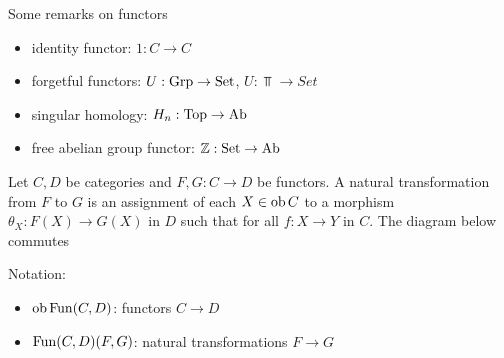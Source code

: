 \documentclass{report}
\begin{document}
\begin{remark}
    Some remarks on functors
    \begin{itemize}
        \item identity functor: $1: C \to C$
        \item forgetful functors: $U: \operatorname{Grp} \to \operatorname{Set}$, $U: \Top \to Set$
        \item singular homology: $H_n: \operatorname{Top} \to \operatorname{Ab}$
        \item free abelian group functor: $\mathbb{Z}: \operatorname{Set} \to \operatorname{Ab}$
    \end{itemize}
\end{remark}

\begin{definition}
    Let $C, D$ be categories and $F, G: C \to D$ be functors. A natural transformation from $F$ to $G$ is an assignment of each $X \in \operatorname{ob} C$ to a morphism $\theta_X: F(X) \to G(X)$ in $D$ such that for all $f: X \to Y$ in $C$. The diagram below commutes
    \begin{center}
    \end{center}
    Notation:
    \begin{itemize}
        \item $\operatorname{ob} \operatorname{Fun}(C, D)$: functors $C \to D$
        \item $\operatorname{Fun}(C, D)(F, G)$: natural transformations $F \to G$
    \end{itemize}
\end{definition}
\end{document}
